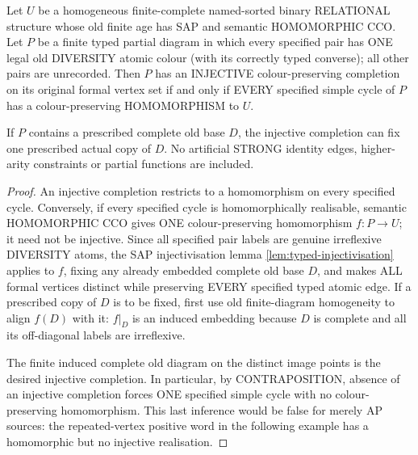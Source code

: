 \begin{lemma}
\label{lem:typed-strong-cycle-completion}
Let $U$ be a homogeneous finite-complete named-sorted binary
RELATIONAL structure whose old finite age has SAP and semantic
HOMOMORPHIC CCO. Let $P$ be a finite typed partial diagram in
which every specified pair has ONE legal old DIVERSITY atomic
colour (with its correctly typed converse); all other pairs
are unrecorded. Then $P$ has an INJECTIVE colour-preserving
completion on its original formal vertex set if and only if
EVERY specified simple cycle of $P$ has a colour-preserving
HOMOMORPHISM to $U$.

If $P$ contains a prescribed complete old base $D$, the
injective completion can fix one prescribed actual copy
of $D$. No artificial STRONG identity edges, higher-arity
constraints or partial functions are included.
\end{lemma}
\begin{proof}
An injective completion restricts to a homomorphism on
every specified cycle. Conversely, if every specified
cycle is homomorphically realisable, semantic HOMOMORPHIC
CCO gives ONE colour-preserving homomorphism $f:P\to U$;
it need not be injective. Since all specified pair labels
are genuine irreflexive DIVERSITY atoms, the SAP
injectivisation lemma
\cref{lem:typed-injectivisation} applies to $f$, fixing
any already embedded complete old base $D$, and makes
ALL formal vertices distinct while preserving EVERY
specified typed atomic edge. If a prescribed copy of
$D$ is to be fixed, first use old finite-diagram
homogeneity to align $f(D)$ with it: $f|_D$ is an
induced embedding because $D$ is complete and all its
off-diagonal labels are irreflexive.

The finite induced complete old diagram on the
distinct image points is the desired injective
completion. In particular, by CONTRAPOSITION, absence
of an injective completion forces ONE specified simple
cycle with no colour-preserving homomorphism. This
last inference would be false for merely AP sources:
the repeated-vertex positive word in the following
example has a homomorphic but no injective realisation.
\end{proof}

